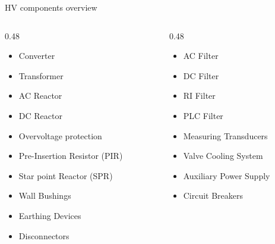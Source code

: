 
\newcommand{\cfig}[1]{terminal/components/figures/#1}

\begin{frame}{HV components overview}
  \begin{columns}[T,onlytextwidth]
    \begin{column}{0.48\textwidth}
      \begin{itemize}
        \setlength{\itemsep}{0.5em}
        \item Converter
        \item Transformer
        \item AC Reactor
        \item DC Reactor
        \item Overvoltage protection
        \item Pre-Insertion Resistor (PIR)
        \item Star point Reactor (SPR)
        \item Wall Bushings
        \item Earthing Devices
        \item Disconnectors
      \end{itemize}
    \end{column}
    \begin{column}{0.48\textwidth}
      \begin{itemize}
        \setlength{\itemsep}{0.5em}
        \item AC Filter
        \item DC Filter
        \item RI Filter
        \item PLC Filter
        \item Measuring Transducers
        \item Valve Cooling System
        \item Auxiliary Power Supply
        \item Circuit Breakers
      \end{itemize}
    \end{column}
  \end{columns}
\end{frame}



% 
% 
% 
% 
